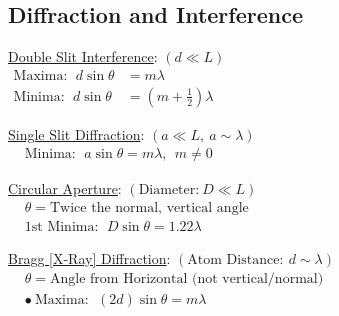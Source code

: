 \documentclass[12pt]{article}
\begin{document}
\subsection{Diffraction and Interference}
\vspace{5pt}
\begin{minipage}[t]{.49\textwidth}
	\setlength{\parindent}{.5cm}\noindent
	\underline{Double Slit Interference}: \hspace{.1cm} \((d \ll L)\)\\[10pt]
	\indent\(\begin{aligned}
		\text{Maxima}:\ \ d \sin{\theta} &= m \lambda\\[5pt]
		\text{Minima}:\ \ d \sin{\theta} &= (m + \tfrac{1}{2}) \lambda
	\end{aligned}\)	
\end{minipage}
\begin{minipage}[t]{.49\textwidth}
	\setlength{\parindent}{.5cm}\noindent
	\underline{Single Slit Diffraction}: \hspace{.1cm} \((a \ll L,\ a \sim \lambda)\)\\[10pt]
	\indent\(\begin{aligned}
		&\text{Minima}:\ \ a \sin{\theta} = m \lambda, \ \ m \neq 0
	\end{aligned}\)
\end{minipage}

\vspace{5pt}\noindent
\begin{minipage}{.49\textwidth}
	\setlength{\parindent}{.5cm}\noindent
	\underline{Circular Aperture}: \hspace{.1cm} \((\text{Diameter:}\ D \ll L)\)\\[10pt]
	\indent\(\begin{aligned}
		&\theta = \text{Twice the normal, vertical angle}\\[5pt]
		&\text{1st Minima}:\ \ D \sin{\theta} = 1.22 \lambda
	\end{aligned}\)	
\end{minipage}
\begin{minipage}{.49\textwidth}
	\setlength{\parindent}{.5cm}\noindent
	\underline{Bragg [X-Ray] Diffraction}: \hspace{.1cm} \((\text{Atom Distance}:\ d \sim \lambda)\)\\[10pt]
	\indent\(\begin{aligned}
		&\theta = \text{Angle from Horizontal (not vertical/normal)}\\[5pt]
		&\bullet \ \text{Maxima}:\ \ (2d) \sin{\theta} = m \lambda 
	\end{aligned}\)
\end{minipage}
\end{document}
